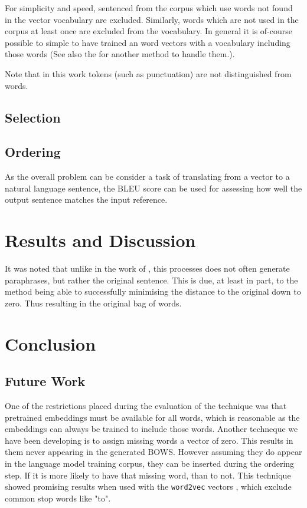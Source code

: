 \documentclass[]{scrartcl}
\numberwithin{equation}{section}
\numberwithin{figure}{section}
\theoremstyle{plain}
\theoremstyle{definition}
\begin{document}
For simplicity and speed, sentenced from the corpus which use words not found in the vector vocabulary are excluded. Similarly, words which are not used in the corpus at least once are excluded from the vocabulary. In general it is of-course possible to simple to have trained an word vectors with a vocabulary including those words (See also the  for another method to handle them.). 


Note that in this work tokens (such as punctuation) are not distinguished from words.

\subsection{Selection}
\subsection{Ordering}
As the overall problem can be consider a task of translating from a vector to a natural language sentence, the BLEU  score \parencite{Papineni2002} can be used for assessing how well the output sentence matches the input reference.

\section{Results and Discussion}
\begin{table}
	\overall
	\pgfplotstabletranspose[input colnames to=] \overallt \overall
	\pgfplotstabletypeset[columns/1/.style={column name={Mean Jaccard Index}}]\overallt
\end{table}


It was noted that unlike in the work of \cite{iyyer2014generating}, this processes does not often generate paraphrases, but rather the original sentence. This is due, at least in part, to the method being able to successfully minimising the distance to the original down to zero. Thus resulting in the original bag of words.

\section{Conclusion}

\subsection{Future Work}\label{future}
One of the restrictions placed during the evaluation of the technique was that pretrained embeddings must be available for all words, which is reasonable as the embeddings can always be trained to include those words. Another techneque we have been developing is to assign missing words a vector of zero. This results in them never appearing in the generated BOWS. However assuming they do appear in the language model training corpus, they can be inserted during the ordering step. If it is more likely to have that missing word, than to not. This technique showed promising results when used with the \texttt{word2vec} vectors \parencite{mikolovSkip}, which exclude common stop words like "to".
\end{document}
